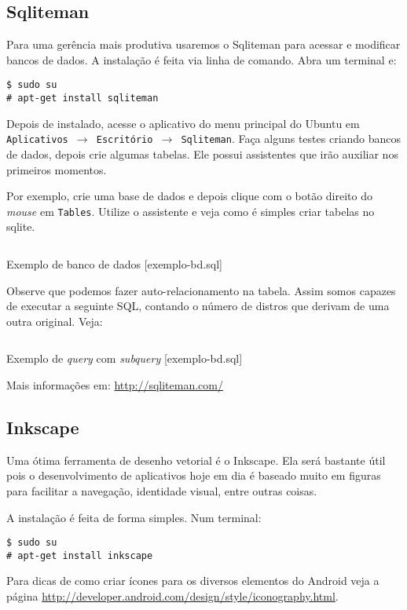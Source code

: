 \subsection{Sqliteman}

Para uma gerência mais produtiva usaremos o Sqliteman para acessar e modificar bancos de dados. A instalação
é feita via linha de comando. Abra um terminal e:

\begin{flushleft}
\texttt{\$ sudo su\\
\# apt-get install sqliteman\\}
\end{flushleft}

Depois de instalado, acesse o aplicativo do menu principal do Ubuntu em \texttt{Aplicativos $\rightarrow$
Escritório $\rightarrow$ Sqliteman}. Faça alguns testes criando bancos de dados, depois crie algumas tabelas.
Ele possui assistentes que irão auxiliar nos primeiros momentos.

Por exemplo, crie uma base de dados e depois clique com o botão direito do \textit{mouse} em \texttt{Tables}.
Utilize o assistente e veja como é simples criar tabelas no sqlite.

\begin{listing}[H]
  \inputminted[linenos=true,frame=bottomline,tabsize=3]{ sql }{ source/exemplo-bd-1.sql }
  \caption{Exemplo de banco de dados [exemplo-bd.sql]}
\end{listing}

Observe que podemos fazer auto-relacionamento na tabela. Assim somos capazes de executar a seguinte SQL,
contando o número de distros que derivam de uma outra original. Veja:

\begin{listing}[H]
  \inputminted[linenos=true,frame=bottomline,tabsize=3]{ sql }{ source/exemplo-bd-2.sql }
  \caption{Exemplo de \textit{query} com \textit{subquery} [exemplo-bd.sql]}
\end{listing}

Mais informações em: \url{http://sqliteman.com/}

\subsection{Inkscape}

Uma ótima ferramenta de desenho vetorial é o Inkscape. Ela será bastante útil pois o desenvolvimento
de aplicativos hoje em dia é baseado muito em figuras para facilitar a navegação, identidade visual,
entre outras coisas.

A instalação é feita de forma simples. Num terminal:

\begin{flushleft}
\texttt{\$ sudo su\\
\# apt-get install inkscape\\}
\end{flushleft}

Para dicas de como criar ícones para os diversos elementos do Android veja a página
\url{http://developer.android.com/design/style/iconography.html}.

